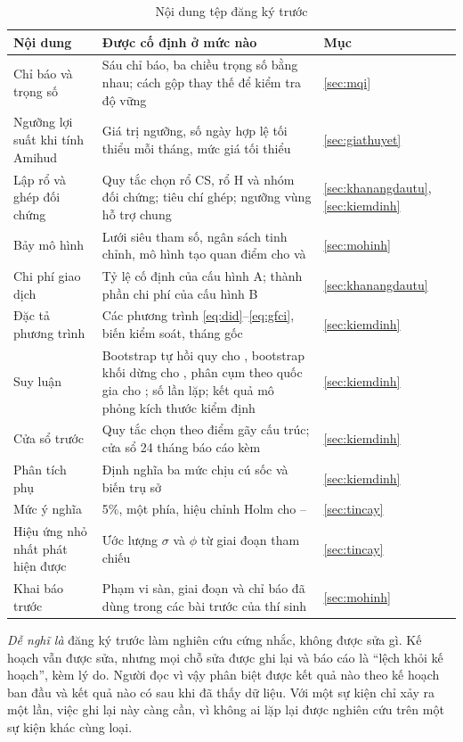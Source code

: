 \begin{table}[H]
\myfloatalign
\caption{Nội dung tệp đăng ký trước}\label{tab:dangky}
{\bangnho
\begin{tabularx}{\textwidth}{@{}>{\raggedright\arraybackslash}p{} L >{\raggedright\arraybackslash}p{0.12\textwidth}@{}}
\toprule
Nội dung & Được cố định ở mức nào & Mục\\
\midrule
Chỉ báo và trọng số & Sáu chỉ báo, ba chiều trọng số bằng nhau; cách gộp thay thế để kiểm tra độ vững & \ref{sec:mqi}\\
Ngưỡng lợi suất khi tính Amihud & Giá trị ngưỡng, số ngày hợp lệ tối thiểu mỗi tháng, mức giá tối thiểu & \ref{sec:giathuyet}\\
Lập rổ và ghép đối chứng & Quy tắc chọn rổ CS, rổ H và nhóm đối chứng; tiêu chí ghép; ngưỡng vùng hỗ trợ chung & \ref{sec:khanangdautu}, \ref{sec:kiemdinh}\\
Bảy mô hình & Lưới siêu tham số, ngân sách tinh chỉnh, mô hình tạo quan điểm cho  và  & \ref{sec:mohinh}\\
Chi phí giao dịch & Tỷ lệ cố định của cấu hình A; thành phần chi phí của cấu hình B & \ref{sec:khanangdautu}\\
Đặc tả phương trình & Các phương trình \eqref{eq:did}--\eqref{eq:gfci}, biến kiểm soát, tháng gốc & \ref{sec:kiemdinh}\\
Suy luận & Bootstrap tự hồi quy cho , bootstrap khối dừng cho , phân cụm theo quốc gia cho ; số lần lặp; kết quả mô phỏng kích thước kiểm định & \ref{sec:kiemdinh}\\
Cửa sổ trước & Quy tắc chọn theo điểm gãy cấu trúc; cửa sổ 24 tháng báo cáo kèm & \ref{sec:kiemdinh}\\
Phân tích phụ & Định nghĩa ba mức chịu cú sốc và biến trụ sở & \ref{sec:kiemdinh}\\
Mức ý nghĩa & 5\%, một phía, hiệu chỉnh Holm cho -- & \ref{sec:tincay}\\
Hiệu ứng nhỏ nhất phát hiện được & Ước lượng $\sigma$ và $\phi$ từ giai đoạn tham chiếu & \ref{sec:tincay}\\
Khai báo trước & Phạm vi sàn, giai đoạn và chỉ báo đã dùng trong các bài trước của thí sinh & \ref{sec:mohinh}\\
\bottomrule
\end{tabularx}}
\end{table}

\begin{delam}
\emph{Dễ nghĩ là} đăng ký trước làm nghiên cứu cứng nhắc, không được sửa gì. Kế hoạch vẫn được sửa, nhưng mọi chỗ sửa được ghi lại và báo cáo là \enquote{lệch khỏi kế hoạch}, kèm lý do. Người đọc vì vậy phân biệt được kết quả nào theo kế hoạch ban đầu và kết quả nào có sau khi đã thấy dữ liệu. Với một sự kiện chỉ xảy ra một lần, việc ghi lại này càng cần, vì không ai lặp lại được nghiên cứu trên một sự kiện khác cùng loại.
\end{delam}

